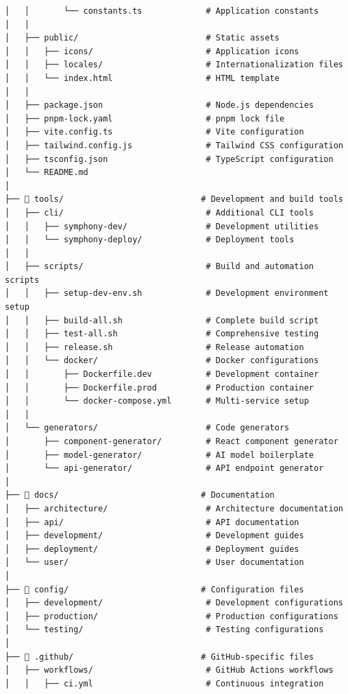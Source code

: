 \begin{lstlisting}[language=text, caption=Complete Repository Structure]
│   │       └── constants.ts             # Application constants
│   │
│   ├── public/                          # Static assets
│   │   ├── icons/                       # Application icons
│   │   ├── locales/                     # Internationalization files
│   │   └── index.html                   # HTML template
│   │
│   ├── package.json                     # Node.js dependencies
│   ├── pnpm-lock.yaml                   # pnpm lock file
│   ├── vite.config.ts                   # Vite configuration
│   ├── tailwind.config.js               # Tailwind CSS configuration
│   ├── tsconfig.json                    # TypeScript configuration
│   └── README.md
│
├── 📁 tools/                            # Development and build tools
│   ├── cli/                             # Additional CLI tools
│   │   ├── symphony-dev/                # Development utilities
│   │   └── symphony-deploy/             # Deployment tools
│   │
│   ├── scripts/                         # Build and automation scripts
│   │   ├── setup-dev-env.sh             # Development environment setup
│   │   ├── build-all.sh                 # Complete build script
│   │   ├── test-all.sh                  # Comprehensive testing
│   │   ├── release.sh                   # Release automation
│   │   └── docker/                      # Docker configurations
│   │       ├── Dockerfile.dev           # Development container
│   │       ├── Dockerfile.prod          # Production container
│   │       └── docker-compose.yml       # Multi-service setup
│   │
│   └── generators/                      # Code generators
│       ├── component-generator/         # React component generator
│       ├── model-generator/             # AI model boilerplate
│       └── api-generator/               # API endpoint generator
│
├── 📁 docs/                             # Documentation
│   ├── architecture/                    # Architecture documentation
│   ├── api/                             # API documentation
│   ├── development/                     # Development guides
│   ├── deployment/                      # Deployment guides
│   └── user/                            # User documentation
│
├── 📁 config/                           # Configuration files
│   ├── development/                     # Development configurations
│   ├── production/                      # Production configurations
│   └── testing/                         # Testing configurations
│
├── 📁 .github/                          # GitHub-specific files
│   ├── workflows/                       # GitHub Actions workflows
│   │   ├── ci.yml                       # Continuous integration

\end{lstlisting}
